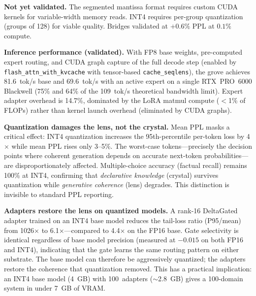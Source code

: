 \documentclass{article}
\begin{document}
\textbf{Not yet validated.} The segmented mantissa format requires
custom CUDA kernels for variable-width memory reads. INT4 requires
per-group quantization (groups of 128) for viable quality. Bridges
validated at $+0.6\%$ PPL at $0.1\%$ compute.

\textbf{Inference performance (validated).} With FP8 base weights,
pre-computed expert routing, and CUDA graph capture of the full decode
step (enabled by \texttt{flash\_attn\_with\_kvcache} with tensor-based
\texttt{cache\_seqlens}), the grove achieves 81.6~tok/s base and
69.6~tok/s with an active expert on a single RTX~PRO~6000 Blackwell
(75\% and 64\% of the 109~tok/s theoretical bandwidth limit). Expert
adapter overhead is 14.7\%, dominated by the LoRA matmul compute
($<$1\% of FLOPs) rather than kernel launch overhead (eliminated by
CUDA graphs).

\textbf{Quantization damages the lens, not the crystal.} Mean PPL
masks a critical effect: INT4 quantization increases the 95th-percentile
per-token loss by 4$\times$ while mean PPL rises only 3--5\%. The
worst-case tokens---precisely the decision points where coherent
generation depends on accurate next-token probabilities---are
disproportionately affected. Multiple-choice accuracy (factual recall)
remains 100\% at INT4, confirming that \emph{declarative knowledge}
(crystal) survives quantization while \emph{generative coherence}
(lens) degrades. This distinction is invisible to standard PPL
reporting.

\textbf{Adapters restore the lens on quantized models.} A rank-16
DeltaGated adapter trained on an INT4 base model reduces the
tail-loss ratio (P95/mean) from 1026$\times$ to 6.1$\times$---compared
to 4.4$\times$ on the FP16 base. Gate selectivity is identical
regardless of base model precision (measured at $-0.015$ on both FP16
and INT4), indicating that the gate learns the same routing pattern on
either substrate. The base model can therefore be aggressively
quantized; the adapters restore the coherence that quantization
removed. This has a practical implication: an INT4 base model
(4~GB) with 100~adapters (${\sim}$2.8~GB) gives a 100-domain system
in under 7~GB of VRAM.

\end{document}
